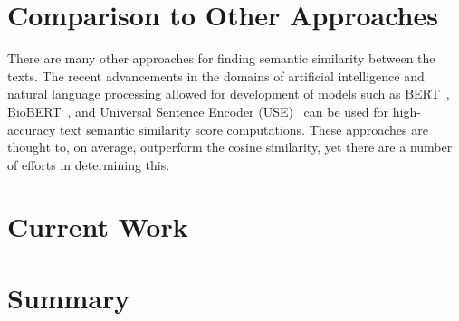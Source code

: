 \documentclass[11pt]{article}
\begin{document}
\section{Comparison to Other Approaches}

There are many other approaches for finding semantic similarity between the
texts. The recent advancements in the domains of artificial intelligence and
natural language processing allowed for development of models such as
BERT~\cite{turc2019}, BioBERT~\cite{btz682}, and Universal Sentence Encoder
(USE)~\cite{use} can be used for high-accuracy text semantic similarity score
computations. These approaches are thought to, on average, outperform the
cosine similarity, yet there are a number of efforts in determining this.


\section{Current Work}


\section{Summary}


\printbibliography[heading=bibintoc]

\end{document}
